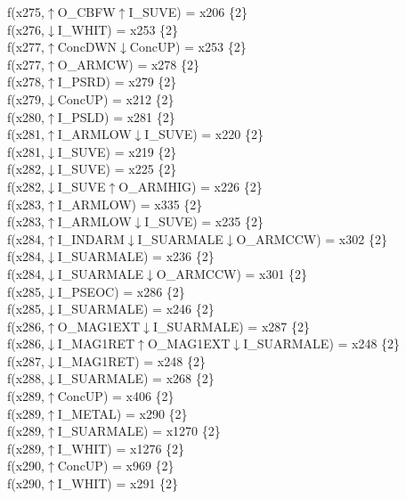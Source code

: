 f(x275,$\uparrow$O\_CBFW$\uparrow$I\_SUVE) = x206 \{2\} \\  
f(x276,$\downarrow$I\_WHIT) = x253 \{2\} \\  
f(x277,$\uparrow$ConcDWN$\downarrow$ConcUP) = x253 \{2\} \\  
f(x277,$\uparrow$O\_ARMCW) = x278 \{2\} \\  
f(x278,$\uparrow$I\_PSRD) = x279 \{2\} \\  
f(x279,$\downarrow$ConcUP) = x212 \{2\} \\  
f(x280,$\uparrow$I\_PSLD) = x281 \{2\} \\  
f(x281,$\uparrow$I\_ARMLOW$\downarrow$I\_SUVE) = x220 \{2\} \\  
f(x281,$\downarrow$I\_SUVE) = x219 \{2\} \\  
f(x282,$\downarrow$I\_SUVE) = x225 \{2\} \\  
f(x282,$\downarrow$I\_SUVE$\uparrow$O\_ARMHIG) = x226 \{2\} \\  
f(x283,$\uparrow$I\_ARMLOW) = x335 \{2\} \\  
f(x283,$\uparrow$I\_ARMLOW$\downarrow$I\_SUVE) = x235 \{2\} \\  
f(x284,$\uparrow$I\_INDARM$\downarrow$I\_SUARMALE$\downarrow$O\_ARMCCW) = x302 \{2\} \\  
f(x284,$\downarrow$I\_SUARMALE) = x236 \{2\} \\  
f(x284,$\downarrow$I\_SUARMALE$\downarrow$O\_ARMCCW) = x301 \{2\} \\  
f(x285,$\downarrow$I\_PSEOC) = x286 \{2\} \\  
f(x285,$\downarrow$I\_SUARMALE) = x246 \{2\} \\  
f(x286,$\uparrow$O\_MAG1EXT$\downarrow$I\_SUARMALE) = x287 \{2\} \\  
f(x286,$\downarrow$I\_MAG1RET$\uparrow$O\_MAG1EXT$\downarrow$I\_SUARMALE) = x248 \{2\} \\  
f(x287,$\downarrow$I\_MAG1RET) = x248 \{2\} \\  
f(x288,$\downarrow$I\_SUARMALE) = x268 \{2\} \\  
f(x289,$\uparrow$ConcUP) = x406 \{2\} \\  
f(x289,$\uparrow$I\_METAL) = x290 \{2\} \\  
f(x289,$\uparrow$I\_SUARMALE) = x1270 \{2\} \\  
f(x289,$\uparrow$I\_WHIT) = x1276 \{2\} \\  
f(x290,$\uparrow$ConcUP) = x969 \{2\} \\  
f(x290,$\uparrow$I\_WHIT) = x291 \{2\} \\  
